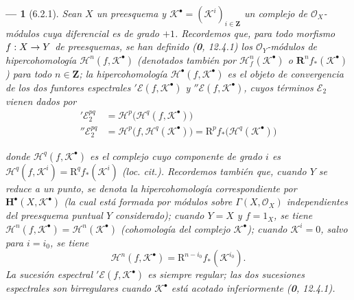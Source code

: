 \documentclass[10pt,oneside,openany]{book}
\theoremstyle{egaenv}\newtheorem*{env}{---}
\theoremstyle{egastatement}
\theoremstyle{egadescription}
\newcommand{\oldpage}[2][]{\marginnote{\normalfont\scriptsize\textbf{#1}\,|\,#2}\ignorespaces}
\renewcommand{\to}{\mathchoice{\longrightarrow}{\rightarrow}{\rightarrow}{\rightarrow}}
\begin{document}
\begin{env}[6.2.1]
Sean $X$ un preesquema y
$\mathscr K^\bullet=(\mathscr K^i)_{i\in\mathbf Z}$ un complejo de
$\mathscr O_X$-módulos cuya diferencial es de grado $+1$.
Recordemos que, para todo morfismo $f:X\to Y$ de preesquemas, se han definido
(\textbf 0, 12.4.1) los $\mathscr O_Y$-\emph{módulos de hipercohomología}
$\mathscr H^n(f,\mathscr K^\bullet)$ (denotados también por
$\mathscr H_f^n(\mathscr K^\bullet)$ o
$\mathbf R^n f_*(\mathscr K^\bullet)$) para todo $n\in\mathbf Z$;
la hipercohomología $\mathscr H^\bullet(f,\mathscr K^\bullet)$ es el objeto de
convergencia de los dos funtores espectrales
$'\mathscr E(f,\mathscr K^\bullet)$ y
$''\mathscr E(f,\mathscr K^\bullet)$, cuyos términos $\mathscr E_2$ vienen
dados por
\begin{align}
  '\mathscr E_2^{pq}
    &=\mathscr H^p\bigl(\mathscr H^q(f,\mathscr K^\bullet)\bigr)
    \tag{6.2.1.1}\label{III.6.2.1.1.fr}\\
  ''\mathscr E_2^{pq}
    &=\mathscr H^p\bigl(f,\mathscr H^q(\mathscr K^\bullet)\bigr)
      =\mathrm R^p f_*\bigl(\mathscr H^q(\mathscr K^\bullet)\bigr)
    \tag{6.2.1.2}\label{III.6.2.1.2.fr}
\end{align}

\oldpage[III]{139}

donde $\mathscr H^q(f,\mathscr K^\bullet)$ es el \emph{complejo} cuyo componente de
grado $i$ es
$\mathscr H^q(f,\mathscr K^i)=\mathrm R^q f_*(\mathscr K^i)$ \emph{(loc. cit.)}.
Recordemos también que, cuando $Y$ se reduce a un punto, se denota la
hipercohomología correspondiente por $\mathbf H^\bullet(X,\mathscr K^\bullet)$
(la cual está formada por \emph{módulos} sobre $\Gamma(X,\mathscr O_X)$ independientes
del preesquema puntual $Y$ considerado); cuando $Y=X$ y $f=1_X$, se tiene
$\mathscr H^n(f,\mathscr K^\bullet)=\mathscr H^n(\mathscr K^\bullet)$
(cohomología del complejo $\mathscr K^\bullet$); cuando
$\mathscr K^i=0$, salvo para $i=i_0$, se tiene
\[
  \mathscr H^n(f,\mathscr K^\bullet)
    =\mathrm R^{n-i_0}f_*(\mathscr K^{i_0}).
\]
La sucesión espectral $'\mathscr E(f,\mathscr K^\bullet)$ es siempre
\emph{regular}; las dos sucesiones espectrales son \emph{birregulares} cuando
$\mathscr K^\bullet$ está acotado inferiormente (\textbf 0, 12.4.1).


\end{env}
\end{document}
